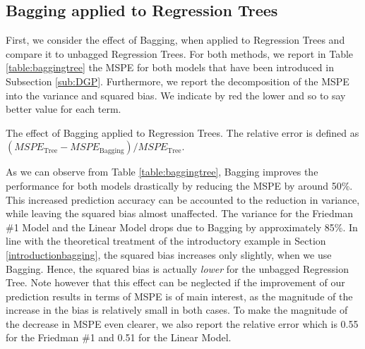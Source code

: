 \subsection{Bagging applied to Regression Trees} \label{sub:bagging_table}

First, we consider the effect of Bagging, when applied to Regression Trees and compare it to unbagged Regression Trees. For both methods, we report in Table \ref{table:baggingtree} the MSPE for both models that have been introduced in Subsection \ref{sub:DGP}. Furthermore, we report the decomposition of the MSPE into the variance and squared bias. We indicate by red the lower and so to say better value for each term.
\begin{table}[H]
  \caption[The effect of Bagging applied to Regression Trees.]{The effect of Bagging applied to Regression Trees. The relative error is defined as $(MSPE_{\text{Tree}} - MSPE_{\text{Bagging}})/ MSPE_{\text{Tree}}$.}
  \centering

 \label{table:baggingtree}
\end{table}

As we can observe from Table \ref{table:baggingtree}, Bagging improves the performance for both models drastically by reducing the MSPE by around 50\%. This increased prediction accuracy can be accounted to the reduction in variance, while leaving the squared bias almost unaffected. The variance for the Friedman \#1 Model and the Linear Model drops due to Bagging by approximately 85\%. In line with the theoretical treatment of the introductory example in Section \ref{introductionbagging}, the squared bias increases only slightly, when we use Bagging. Hence, the squared bias is actually \textit{lower} for the unbagged Regression Tree. Note however that this effect can be neglected if the improvement of our prediction results in terms of MSPE is of main interest, as the magnitude of the increase in the bias is relatively small in both cases. \newline
To make the magnitude of the decrease in MSPE even clearer, we also report the relative error which is 0.55 for the Friedman \#1 and 0.51 for the Linear
Model.



